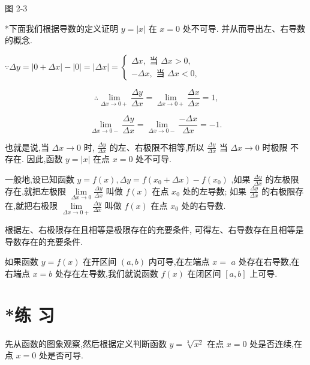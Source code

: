 \documentclass[10pt]{article}
\begin{document}
图 2-3

*下面我们根据导数的定义证明 \(y = \left| x\right|\) 在 \(x = 0\) 处不可导. 并从而导出左、右导数的概念.

\(\because {\Delta y} = \left| {0 + {\Delta x}}\right| - \left| 0\right| = \left| {\Delta x}\right| = \left\{ \begin{array}{r} {\Delta x},\text{ 当 }{\Delta x} > 0, \\ - {\Delta x},\text{ 当 }{\Delta x} < 0, \end{array}\right.\)

\[
\therefore \mathop{\lim }\limits_{{{\Delta x} \rightarrow 0 + }}\frac{\Delta y}{\Delta x} = \mathop{\lim }\limits_{{{\Delta x} \rightarrow 0 + }}\frac{\Delta x}{\Delta x} = 1\text{,}
\]

\[
\mathop{\lim }\limits_{{{\Delta x} \rightarrow 0 - }}\frac{\Delta y}{\Delta x} = \mathop{\lim }\limits_{{{\Delta x} \rightarrow 0 - }}\frac{-{\Delta x}}{\Delta x} = - 1.
\]

也就是说,当 \({\Delta x} \rightarrow 0\) 时, \(\frac{\Delta y}{\Delta x}\) 的左、右极限不相等,所以 \(\frac{\Delta y}{\Delta x}\) 当 \({\Delta x} \rightarrow 0\) 时极限 不存在. 因此,函数 \(y = \left| x\right|\) 在点 \(x = 0\) 处不可导.

一般地,设已知函数 \(y = f\left( x\right) ,{\Delta y} = f\left( {{x}_{0} + {\Delta x}}\right) - f\left( {x}_{0}\right)\) ,如果 \(\frac{\Delta y}{\Delta x}\) 的左极限存在,就把左极限 \(\mathop{\lim }\limits_{{{\Delta x} \rightarrow 0}}\frac{\Delta y}{\Delta x}\) 叫做 \(f\left( x\right)\) 在点 \({x}_{0}\) 处的左导数; 如果 \(\frac{\Delta y}{\Delta x}\) 的右极限存在,就把右极限 \(\mathop{\lim }\limits_{{{\Delta x} \rightarrow 0 + }}\frac{\Delta y}{\Delta x}\) 叫做 \(f\left( x\right)\) 在点 \({x}_{0}\) 处的右导数.

根据左、右极限存在且相等是极限存在的充要条件, 可得左、右导数存在且相等是导数存在的充要条件.

如果函数 \(y = f\left( x\right)\) 在开区间 \(\left( {a,b}\right)\) 内可导,在左端点 \(x =\) \(a\) 处存在右导数,在右端点 \(x = b\) 处存在左导数,我们就说函数 \(f\left( x\right)\) 在闭区间 \(\left\lbrack {a,b}\right\rbrack\) 上可导.

\section*{*练 习}

先从函数的图象观察,然后根据定义判断函数 \(y = \sqrt[3]{{x}^{2}}\) 在点 \(x = 0\) 处是否连续,在点 \(x = 0\) 处是否可导.
\end{document}
